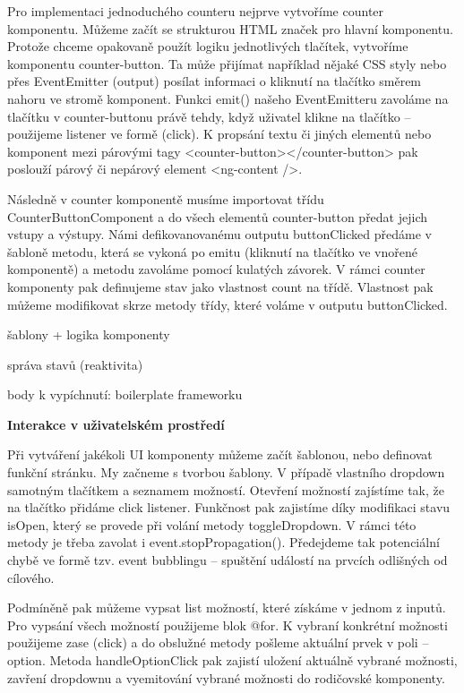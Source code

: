 Pro implementaci jednoduchého counteru nejprve vytvoříme counter komponentu. Můžeme začít se strukturou HTML značek pro hlavní komponentu. 
Protože chceme opakovaně použít logiku jednotlivých tlačítek, vytvoříme komponentu counter-button. 
Ta může přijímat například nějaké CSS styly nebo přes EventEmitter (output) posílat informaci o kliknutí na tlačítko směrem nahoru ve stromě komponent. 
Funkci emit() našeho EventEmitteru zavoláme na tlačítku v counter-buttonu právě tehdy, když uživatel klikne na tlačítko -- použijeme listener ve formě (click). 
K propsání textu či jiných elementů nebo komponent mezi párovými tagy <counter-button></counter-button> pak poslouží párový či nepárový element <ng-content />.

Následně v counter komponentě musíme importovat třídu CounterButtonComponent a do všech elementů counter-button předat jejich vstupy a výstupy. 
Námi defikovanovanému outputu buttonClicked předáme v šabloně metodu, která se vykoná po emitu (kliknutí na tlačítko ve vnořené komponentě) a metodu zavoláme pomocí kulatých závorek. 
V rámci counter komponenty pak definujeme stav jako vlastnost count na třídě. Vlastnost pak můžeme modifikovat skrze metody třídy, které voláme v outputu buttonClicked.

\begin{citemize}
	\item šablony + logika komponenty
	\item správa stavů (reaktivita)
	\item body k vypíchnutí: boilerplate frameworku
\end{citemize}

\begin{flushleft}
  \textbf{Interakce v uživatelském prostředí}
\end{flushleft}

Při vytváření jakékoli UI komponenty můžeme začít šablonou, nebo definovat funkční stránku. My začneme s tvorbou šablony. V případě vlastního dropdown samotným tlačítkem a seznamem možností. 
Otevření možností zajístíme tak, že na tlačítko přidáme click listener. Funkčnost pak zajistíme díky modifikaci stavu isOpen, který se provede při volání metody toggleDropdown. 
V rámci této metody je třeba zavolat i event.stopPropagation(). Předejdeme tak potenciální chybě ve formě tzv. event bubblingu -- spuštění událostí na prvcích odlišných od cílového. 

Podmíněně pak můžeme vypsat list možností, které získáme v jednom z inputů. Pro vypsání všech možností použijeme blok @for. 
K vybraní konkrétní možnosti použijeme zase (click) a do obslužné metody pošleme aktuální prvek v poli -- option. 
Metoda handleOptionClick pak zajistí uložení aktuálně vybrané možnosti, zavření dropdownu a vyemitování vybrané možnosti do rodičovské komponenty.

